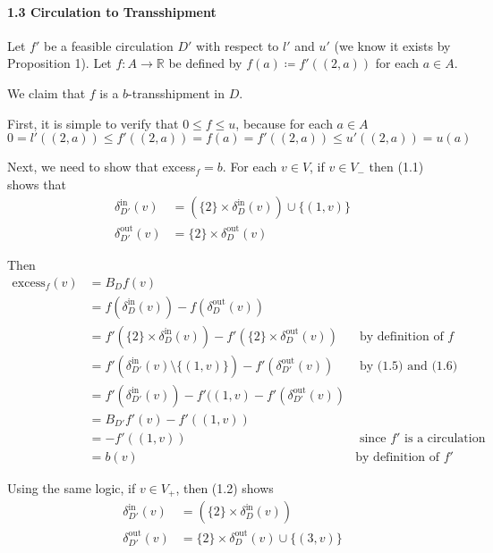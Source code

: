 \documentclass[a4paper,10pt, leqno]{article}
\theoremstyle{definition}
\begin{document}
\paragraph{\textbf{1.3 Circulation to Transshipment}}

Let $f'$ be a feasible circulation $D'$ with respect to $l'$ and $u'$ (we know it exists by Proposition 1).
Let $f : A \to \mathbb{R}$ be defined by $f(a) \coloneqq f'((2, a))$ for each $a \in A$. 

We claim that $f$ is a $b$-transshipment in $D$.

First, it is simple to verify that $0 \leq f \leq u$, because for each $a \in A$ $$0 = l'((2, a)) \leq f'((2, a)) = f(a) = f'((2, a)) \leq u'((2, a)) = u(a)$$

Next, we need to show that excess$_f = b$. For each $v \in V$, if $v \in V_-$ then (1.1) shows that 
\begin{align*}
\tag{1.5}
\delta_{D'}^{\text{in}}(v) &= (\{2\}\times\delta_{D}^{\text{in}}(v)) \cup \{(1, v)\} \\
\tag{1.6}
\delta_{D'}^{\text{out}}(v) &= \{2\}\times\delta_{D}^{\text{out}}(v)
\end{align*}

Then
\begin{align*}
 \text{excess}_f(v) &= B_Df(v) \\
&= f(\delta_D^{\text{in}}(v)) - f(\delta_D^{\text{out}}(v)) \\
&= f'(\{2\} \times \delta_D^{\text{in}}(v)) - f'(\{2\} \times \delta_D^{\text{out}}(v)) &\text{ by definition of }f\\
&= f'(\delta_{D'}^{\text{in}}(v) \setminus \{(1, v)\}) - f'(\delta_{D'}^{\text{out}}(v)) &\text{ by (1.5) and (1.6) } \\
&= f'(\delta_{D'}^{\text{in}}(v)) - f'((1, v) - f'(\delta_{D'}^{\text{out}}(v)) \\
&= B_{D'}f'(v) - f'((1, v)) \\
&= - f'((1, v)) &\text{ since $f'$ is a circulation} \\
&= b(v) &\text{by definition of } f'
\end{align*}

Using the same logic, if $v \in V_+$, then (1.2) shows 
\begin{align*}
\tag{1.7}
\delta_{D'}^{\text{in}}(v) &= (\{2\}\times\delta_{D}^{\text{in}}(v)) \\
\tag{1.8}
\delta_{D'}^{\text{out}}(v) &= \{2\}\times\delta_{D}^{\text{out}}(v) \cup \{(3, v)\} 
\end{align*}
\end{document}
